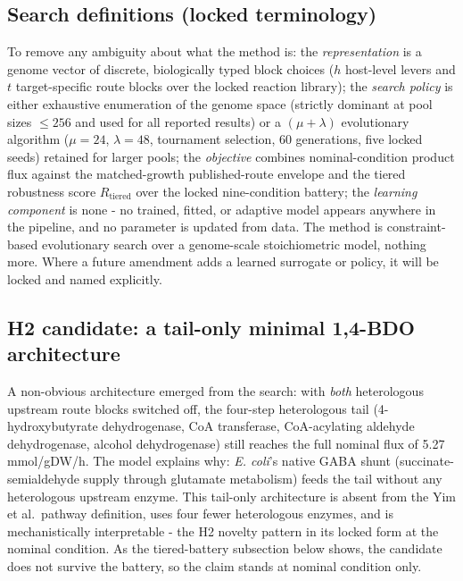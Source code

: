 \documentclass[12pt,a4paper]{article}
\begin{document}
\subsection{Search definitions (locked terminology)}
To remove any ambiguity about what the method is: the \emph{representation} is a genome vector of discrete, biologically typed block choices ($h$ host-level levers and $t$ target-specific route blocks over the locked reaction library); the \emph{search policy} is either exhaustive enumeration of the genome space (strictly dominant at pool sizes $\le 256$ and used for all reported results) or a $(\mu{+}\lambda)$ evolutionary algorithm ($\mu=24$, $\lambda=48$, tournament selection, 60 generations, five locked seeds) retained for larger pools; the \emph{objective} combines nominal-condition product flux against the matched-growth published-route envelope and the tiered robustness score $R_{\mathrm{tiered}}$ over the locked nine-condition battery; the \emph{learning component} is none - no trained, fitted, or adaptive model appears anywhere in the pipeline, and no parameter is updated from data. The method is constraint-based evolutionary search over a genome-scale stoichiometric model, nothing more. Where a future amendment adds a learned surrogate or policy, it will be locked and named explicitly.

\subsection{H2 candidate: a tail-only minimal 1,4-BDO architecture}
A non-obvious architecture emerged from the search: with \emph{both} heterologous upstream route blocks switched off, the four-step heterologous tail (4-hydroxybutyrate dehydrogenase, CoA transferase, CoA-acylating aldehyde dehydrogenase, alcohol dehydrogenase) still reaches the full nominal flux of 5.27 mmol/gDW/h. The model explains why: \emph{E. coli}'s native GABA shunt (succinate-semialdehyde supply through glutamate metabolism) feeds the tail without any heterologous upstream enzyme. This tail-only architecture is absent from the Yim et al.\ pathway definition, uses four fewer heterologous enzymes, and is mechanistically interpretable - the H2 novelty pattern in its locked form at the nominal condition. As the tiered-battery subsection below shows, the candidate does not survive the battery, so the claim stands at nominal condition only.
\end{document}
